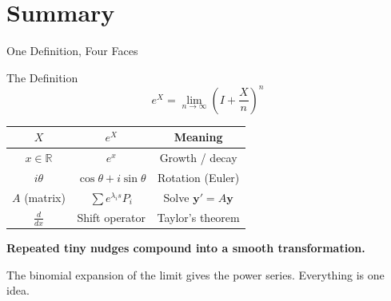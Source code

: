 \documentclass[10pt]{beamer}
\theoremstyle{definition}
\newcommand{\x}[1]{\alert{\textbf{#1}}}
\begin{document}
\section{Summary}


\begin{frame}{One Definition, Four Faces}

\begin{block}{The Definition}
$$e^X = \lim_{n\to\infty}\left(I + \frac{X}{n}\right)^n$$
\end{block}

\vfill

\begin{center}
\renewcommand{\arraystretch}{1.6}
\begin{tabular}{c|c|c}
$X$ & $e^X$ & Meaning \\
\hline
$x \in \mathbb{R}$ & $e^x$ & Growth / decay \\
$i\theta$ & $\cos\theta + i\sin\theta$ & Rotation (Euler) \\
$A$ (matrix) & $\sum e^{\lambda_i s} P_i$ & Solve $\mathbf{y}' = A\mathbf{y}$ \\
$\frac{d}{dx}$ & Shift operator & Taylor's theorem
\end{tabular}
\end{center}

\vfill\pause

\x{Repeated tiny nudges compound into a smooth transformation.}

\vfill

The binomial expansion of the limit gives the power series. Everything is one idea.

\end{frame}
\end{document}
